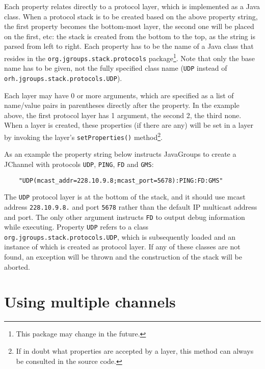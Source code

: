     Each property relates directly to a protocol layer, which is implemented as a
    Java class. When a protocol stack is to be created based on the above property
    string, the first property becomes the bottom-most layer, the second one will be
    placed on the first, etc: the stack is created from the bottom to the top, as the
    string is parsed from left to right. Each property has to be the name of a Java
    class that resides in the {\tt org.jgroups.stack.protocols}
    package\footnote{This package may change in the future.}. Note that only the base
    name has to be given, not the fully specified class name ({\tt UDP} instead of
    {\tt orh.jgroups.stack.protocols.UDP}).

    Each layer may have 0 or more arguments, which are specified as a list of
    name/value pairs in parentheses directly after the property. In the example
    above, the first protocol layer has 1 argument, the second 2, the third
    none. When a layer is created, these properties (if there are any) will be set in
    a layer by invoking the layer's {\tt setProperties()} method\footnote{If in doubt
    what properties are accepted by a layer, this method can always be consulted in
    the source code.}.

    As an example the property string below instructs JavaGroups to create a JChannel
    with protocols {\tt UDP}, {\tt PING}, {\tt FD} and {\tt GMS}:


    \begin{small}
    \begin{verbatim}
    "UDP(mcast_addr=228.10.9.8;mcast_port=5678):PING:FD:GMS"
    \end{verbatim}
    \end{small}


    The {\tt UDP} protocol layer is at the bottom of the stack, and it should use
    mcast address {\tt 228.10.9.8.} and port {\tt 5678} rather than the default IP
    multicast address and port. The only other argument instructs {\tt FD} to output
    debug information while executing. Property {\tt UDP} refers to a class {\tt
    org.jgroups.stack.protocols.UDP}, which is subsequently loaded and an instance
    of which is created as protocol layer. If any of these classes are not found, an
    exception will be thrown and the construction of the stack will be aborted.






  \section{Using multiple channels} \label{MultipleChannels}

